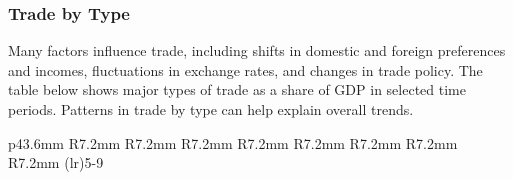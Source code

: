 \subsubsection*{Trade by Type} 
\begin{minipage}{0.76\textwidth} 
\small Many factors influence trade, including shifts in domestic and foreign preferences and incomes, fluctuations in exchange rates, and changes in trade policy. The table below shows major types of trade as a share of GDP in selected time periods. Patterns in trade by type can help explain overall trends. 


\vspace{1mm}

\vspace*{-3.0mm}

{\footnotesize {} \setlength{\tabcolsep}{3.0pt} \color{black!90}
	{\renewcommand{\arraystretch}{1.55}
\begin{tabular}{p{43.6mm} R{7.2mm} R{7.2mm} R{7.2mm} R{7.2mm} R{7.2mm}
		   R{7.2mm} R{7.2mm} R{7.2mm} }
		   \cmidrule(lr){5-9}\addlinespace[-0.8mm]
			  \hline
		\end{tabular}}\vspace{-1.5mm}
		
}
\end{minipage}
\newpage
